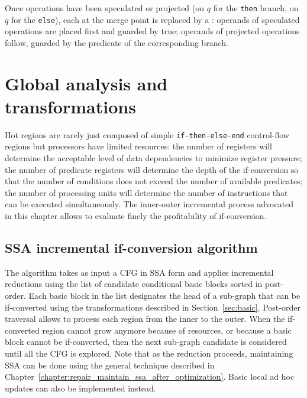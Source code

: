 Once operations have been speculated or projected (on $q$ for the \texttt{then} branch, on $\overline{q}$ for the \texttt{else}), each \phifuns at the merge point is replaced by a \psifun: 
operands of speculated operations are placed first and guarded by true; 
operands of projected operations follow, guarded by the predicate of the corresponding branch.

\section{Global analysis and transformations}
\label{sec:if_conversion:hyperblock}
Hot regions are rarely just composed of simple \texttt{if-then-else-end} control-flow regions but processors have limited resources: 
the number of registers will determine the acceptable level of data dependencies to minimize register pressure; 
the number of predicate registers will determine the depth of the if-conversion so that the number of conditions does not exceed the number of available predicates; 
the number of processing units will determine the number of instructions that can be executed simultaneously. 
The inner-outer incremental process advocated in this chapter allows to evaluate finely the profitability of if-conversion.

\subsection{SSA incremental if-conversion algorithm}


The algorithm takes as input a CFG in SSA form and applies incremental reductions using the list of candidate conditional basic blocks sorted in post-order. 
Each basic block in the list designates the head of a sub-graph that can be if-converted using the transformations described in Section~\ref{sec:basic}. 
Post-order traversal allows to process each region from the inner to the outer. 
When the if-converted region cannot grow anymore because of resources, or because a basic block cannot be if-converted, then the next sub-graph candidate is considered until all the CFG is explored.
%
%
Note that as the reduction proceeds, maintaining SSA can be done using the general technique described in Chapter~\ref{chapter:repair_maintain_ssa_after_optimization}. 
Basic local ad hoc updates can also be implemented instead.

